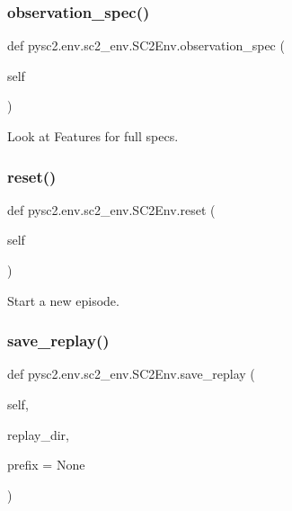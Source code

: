 \subsubsection{\texorpdfstring{observation\+\_\+spec()}{observation\_spec()}}
{\footnotesize\ttfamily def pysc2.\+env.\+sc2\+\_\+env.\+S\+C2\+Env.\+observation\+\_\+spec (\begin{DoxyParamCaption}\item[{}]{self }\end{DoxyParamCaption})}

\begin{DoxyVerb}Look at Features for full specs.\end{DoxyVerb}
 \mbox{\label{classpysc2_1_1env_1_1sc2__env_1_1_s_c2_env_a11123fe4b74625eca2d88a2b837d681f}} 
\subsubsection{\texorpdfstring{reset()}{reset()}}
{\footnotesize\ttfamily def pysc2.\+env.\+sc2\+\_\+env.\+S\+C2\+Env.\+reset (\begin{DoxyParamCaption}\item[{}]{self }\end{DoxyParamCaption})}

\begin{DoxyVerb}Start a new episode.\end{DoxyVerb}
 \mbox{\label{classpysc2_1_1env_1_1sc2__env_1_1_s_c2_env_a55d7cb43c5efffa9cc249a5fd37cfba6}} 
\subsubsection{\texorpdfstring{save\+\_\+replay()}{save\_replay()}}
{\footnotesize\ttfamily def pysc2.\+env.\+sc2\+\_\+env.\+S\+C2\+Env.\+save\+\_\+replay (\begin{DoxyParamCaption}\item[{}]{self,  }\item[{}]{replay\+\_\+dir,  }\item[{}]{prefix = {\ttfamily None} }\end{DoxyParamCaption})}

